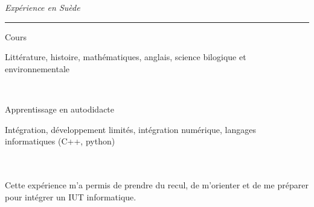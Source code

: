 \documentclass[a4paper,10pt, french]{article}
\begin{document}
\noindent
\textit{\Large \color{MyGray} \hspace{5mm} Expérience en Suède}
\vspace{2mm}
{\color{DefaultGray}\hrule height .1pt}
\vspace{5mm}

\noindent
\begin{minipage}{0.20\textwidth}
	\color{MyGray} Cours
\end{minipage}
\hfill
\begin{minipage}{0.70\textwidth}
	Littérature, histoire, mathématiques, anglais, science bilogique et environnementale
\end{minipage}\\
\vspace{2mm}

\noindent
\begin{minipage}{0.20\textwidth}
	\color{MyGray} Apprentissage en autodidacte
\end{minipage}
\hfill
\begin{minipage}{0.70\textwidth}
	Intégration, développement limités, intégration numérique, langages informatiques (C++, python)
\end{minipage}\\
\vspace{2mm}

\paragraph{} Cette expérience m'a permis de prendre du recul, de m'orienter et de me préparer pour intégrer un IUT informatique.
\end{document}
